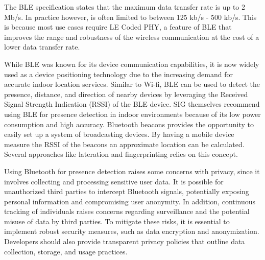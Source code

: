 The BLE specification states that the maximum data transfer rate is up to 2 Mb/s.
In practice however, is often limited to between 125 kb/s - 500 kb/s.
This is because most use cases require LE Coded PHY, a feature of BLE that improves the range and robustness of the wireless communication at the cost of a lower data transfer rate.\cite{BluetoothOverview, BLE_Regulatory_Aspects_Document}

While BLE was known for its device communication capabilities, it is now widely used as a device positioning technology due to the increasing demand for accurate indoor location services.
Similar to Wi-fi, BLE can be used to detect the presence, distance, and direction of nearby devices by leveraging the Received Signal Strength Indication (RSSI) of the BLE device.
SIG themselves recommend using BLE for presence detection in indoor environments because of its low power consumption and high accuracy.\cite{BluetoothOverview}\cite{BLE_Regulatory_Aspects_Document}
Bluetooth beacons provides the opportunity to easily set up a system of broadcasting devices.
By having a mobile device measure the RSSI of the beacons an approximate location can be calculated.
Several approaches like lateration\cite{rssi_indoor_pos,presence_ble_review} and fingerprinting\cite{taking_localization_to_the_wild} relies on this concept.  

Using Bluetooth for presence detection raises some concerns with privacy, since it involves collecting and processing sensitive user data.
It is possible for unauthorized third parties to intercept Bluetooth signals, potentially exposing personal information and compromising user anonymity.
In addition, continuous tracking of individuals raises concerns regarding surveillance and the potential misuse of data by third parties. 
To mitigate these risks, it is essential to implement robust security measures, such as data encryption and anonymization.
Developers should also provide transparent privacy policies that outline data collection, storage, and usage practices.\cite{BluetoothPrivacy,BLE_Security}